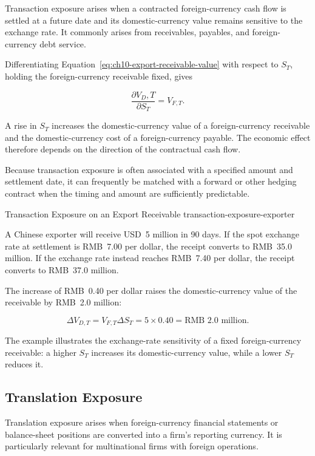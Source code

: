 Transaction exposure arises when a contracted foreign-currency cash flow is settled at a future date and its domestic-currency value remains sensitive to the exchange rate. It commonly arises from receivables, payables, and foreign-currency debt service.

Differentiating Equation~\eqref{eq:ch10-export-receivable-value}
with respect to $S_T$, holding the foreign-currency
receivable fixed, gives

\begin{equation}
\frac{\partial V_D,T}{\partial S_T}=V_{F,T}.
\label{eq:ch10-transaction-exposure-sensitivity}
\end{equation}

A rise in $S_T$ increases the domestic-currency value of a foreign-currency receivable and the domestic-currency cost of a foreign-currency payable. The economic effect therefore depends on the direction of the contractual cash flow.

Because transaction exposure is often associated with a specified amount and settlement date, it can frequently be matched with a forward or other hedging contract when the timing and amount are sufficiently predictable.

\begin{example}{Transaction Exposure on an Export Receivable}
{transaction-exposure-exporter}

A Chinese exporter will receive USD~5 million in
90 days. If the spot exchange rate at settlement
is RMB~7.00 per dollar, the receipt converts to
RMB~35.0 million. If the exchange rate instead
reaches RMB~7.40 per dollar, the receipt converts
to RMB~37.0 million.

The increase of RMB~0.40 per dollar raises the
domestic-currency value of the receivable by
RMB~2.0 million:

\[
\Delta V_{D,T}
=
V_{F,T}\Delta S_T
=
5\times 0.40
=
\text{RMB }2.0\text{ million}.
\]

The example illustrates the exchange-rate
sensitivity of a fixed foreign-currency receivable:
a higher $S_T$ increases its domestic-currency
value, while a lower $S_T$ reduces it.

\end{example}


\subsection{Translation Exposure}

Translation exposure arises when foreign-currency financial statements or balance-sheet positions are converted into a firm's reporting currency. It is particularly relevant for multinational firms with foreign operations.

